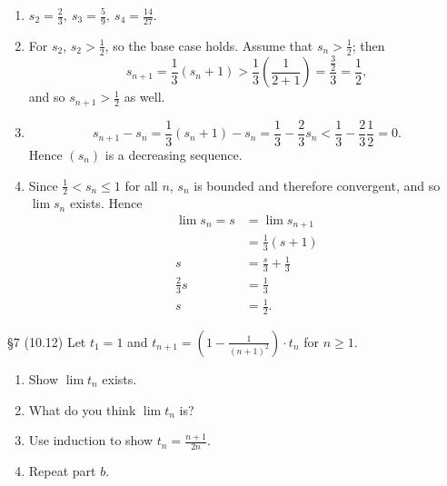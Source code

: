 \documentclass{homework}
\begin{document}
\begin{solution}
  \begin{enumerate}[label=(\alph*)]
    \item $s_2=\frac{2}{3},\ s_3=\frac{5}{9},\ s_4=\frac{14}{27}$.
    \item For $s_2$, $s_2>\frac{1}{2}$, so the base case holds. Assume that $s_n>\frac{1}{2}$; then
      \[
        s_{n+1}=\frac{1}{3}(s_n+1)>\frac{1}{3}(\frac{1}{2+1})=\frac{\frac{3}{2}}{3}=\frac{1}{2}
      ,\] and so $s_{n+1}>\frac{1}{2}$ as well.
    \item \[
        s_{n+1}-s_n=\frac{1}{3}(s_n+1)-s_n=\frac{1}{3}-\frac{2}{3}s_n<\frac{1}{3}-\frac{2}{3}\frac{1}{2}=0
      .\] Hence $(s_n)$ is a decreasing sequence.
    \item Since  $\frac{1}{2}<s_n\le 1$ for all $n$, $s_n$ is bounded and therefore convergent, and
      so $\lim{s_n}$ exists. Hence
      \begin{align*}
        \lim{s_n}=s&= \lim{s_{n+1}} \\
                   &= \frac{1}{3}(s+1)\\
                   s &= \frac{s}{3}+\frac{1}{3} \\
                   \frac{2}{3}s&=\frac{1}{3}\\
                   s&=\frac{1}{2}
      .\end{align*}
  \end{enumerate}
\end{solution}

\begin{problem}{\S 7}
  (10.12) Let $t_1=1$ and $t_{n+1}=\left( 1-\frac{1}{(n+1)^2} \right)\cdot t_n $ for $n\ge 1$.
  \begin{enumerate}[label=(\alph*)]
    \item Show $\lim{t_n}$ exists.
    \item What do you think $\lim{t_n}$ is?
    \item Use induction to show $t_n=\frac{n+1}{2n}$.
    \item Repeat part $b$.
  \end{enumerate}
\end{problem}
\end{document}
